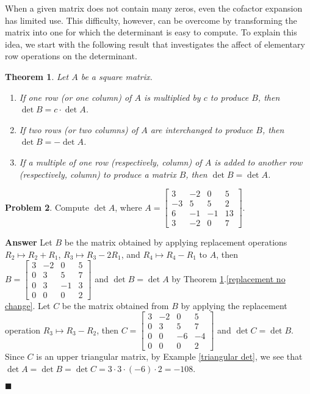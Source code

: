 \documentclass[12pt,letterpaper]{book}
\numberwithin{equation}{section}
\newtheorem{thm}{\textbf{Theorem}}[section]
\theoremstyle{definition}
\newtheorem{problem}[thm]{\textbf{Problem}}
\newenvironment{answer}{\noindent\textbf{Answer}}{\hfill$\blacksquare$\vspace{0.1in}}
\begin{document}
When a given matrix does not contain many zeros, even the cofactor expansion has limited use. This difficulty, however, can be overcome by transforming the matrix into one for which the determinant is easy to compute. To explain this idea, we start with the following result that investigates the affect of elementary row operations on the determinant.

\begin{thm}\label{rowop and det} Let $A$ be a square matrix.
\begin{enumerate}
\item If one row (or one column) of $A$ is multiplied by $c$ to produce $B$, then $\det B=c\cdot \det A$.
\item If two rows (or two columns) of $A$ are interchanged to produce $B$, then $\det B=-\det A$.
\item\label{replacement no change} If a multiple of one row (respectively, column) of $A$ is added to another row (respectively, column) to produce a matrix $B$, then $\det B=\det A$.
\end{enumerate}
\end{thm}

\begin{problem}
 Compute $\det A$, where $A=\left[\begin{array}{rrrr} 3 & -2 & 0 & 5 \\ -3 & 5 & 5 & 2 \\ 6 & -1 & -1 & 13 \\ 3 & -2 & 0 & 7 \end{array}\right]$.
\end{problem}

\begin{answer}
Let $B$ be the matrix obtained by applying replacement operations $R_2\mapsto R_2+R_1$, $R_3\mapsto R_3-2R_1$, and $R_4\mapsto R_4-R_1$ to $A$, then $B=\left[\begin{array}{rrrr} 3 & -2 & 0 & 5 \\ 0 & 3 & 5 & 7 \\ 0 & 3 & -1 & 3 \\ 0 & 0 & 0 & 2 \end{array}\right]$ and $\det B=\det A$ by Theorem \ref{rowop and det}.\ref{replacement no change}. Let $C$ be the matrix obtained from $B$ by applying the replacement operation $R_3\mapsto R_3-R_2$, then $C=\left[\begin{array}{rrrr} 3 & -2 & 0 & 5 \\ 0 & 3 & 5 & 7 \\ 0 & 0 & -6 & -4 \\ 0 & 0 & 0 & 2 \end{array}\right]$ and $\det C=\det B$. Since $C$ is an upper triangular matrix, by Example \ref{triangular det}, we see that $\det A=\det B=\det C=3\cdot 3\cdot (-6)\cdot 2=-108$.

\end{answer}
\end{document}
